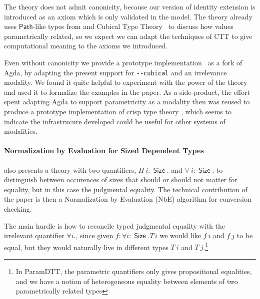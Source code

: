 \documentclass{book}
\DeclareMathOperator{\Size}{\mathsf{Size}}
\newcommand{\sd}{.\,}
\begin{document}
The theory does not admit canonicity, because our version of identity
extension is introduced as an axiom which is only validated in the
model.  The theory already uses $\mathsf{Path}$-like types from
\cite{moulin:mfps15} and Cubical Type Theory~\cite{cohenCoquandHuberMortberg:cubical}
to discuss how values parametrically related, so we expect we
can adapt the techniques of CTT to give computational meaning to the
axioms we introduced.

Even without canonicity we provide a prototype implementation~\cite{agda:parametric} as a
fork of Agda, by adapting the present support for \verb|--cubical| and an
irrelevance modality. We found it quite helpful to experiment with the
power of the theory and used it to formalize the examples in the
paper. As a side-product, the effort spent adapting Agda to support
parametricity as a modality then was reused to produce a prototype
implementation\cite{agda:flat} of crisp type theory \cite{licata:internalUniverses}
, which seems to indicate the infrastrucure developed
could be useful for other systems of modalities.


\paragraph{Normalization by Evaluation for Sized Dependent Types}
also presents a theory with two quantifiers, $\Pi~i : \Size.$ and $\forall~i : \Size.$
to distinguish between occurences of sizes that should or should not
matter for equality, but in this case the judgmental equality.
The technical contribution of the paper is then a Normalization by
Evaluation (NbE) algorithm for conversion checking.

The main hurdle is how to reconcile typed judgmental equality with the
irrelevant quantifier $\forall i.$, since given $f : \forall i :
\Size. T\,i$ we would like $f~i$ and $f~j$ to be equal, but they would
naturally live in different types $T~i$ and $T~j$.\footnote{In ParamDTT, the parametric quantifiers only gives propositional equalities,
      and we have a notion of heterogeneous equality between elements of two
      parametrically related types}


\end{document}
